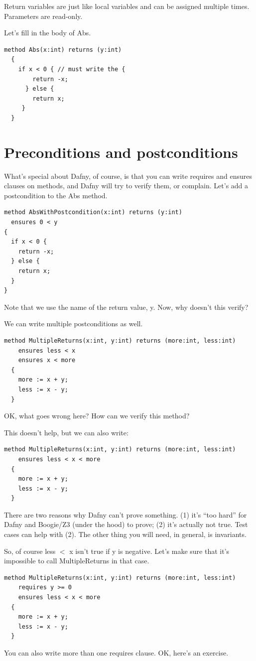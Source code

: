 \documentclass[11pt]{article}
\begin{document}
Return variables are just like local variables and can be assigned multiple times.
Parameters are read-only.

Let's fill in the body of Abs.
\begin{lstlisting}[language=dafny]
  method Abs(x:int) returns (y:int)
  {
    if x < 0 { // must write the {
        return -x;
      } else {
        return x;
     }
  }
\end{lstlisting}

\section*{Preconditions and postconditions}
What's special about Dafny, of course, is that you can write \textsf{requires}
and \textsf{ensures} clauses on methods, and Dafny will try to verify them, or
complain. Let's add a postcondition to the Abs method.
\begin{lstlisting}[language=dafny]
method AbsWithPostcondition(x:int) returns (y:int)
  ensures 0 < y
{
  if x < 0 {
    return -x;
  } else {
    return x;
  }
}
\end{lstlisting}
Note that we use the name of the return value, \textsf{y}. Now, why doesn't this verify?

We can write multiple postconditions as well.
\begin{lstlisting}[language=dafny]
  method MultipleReturns(x:int, y:int) returns (more:int, less:int)
    ensures less < x
    ensures x < more
  {
    more := x + y;
    less := x - y;
  }
\end{lstlisting}
OK, what goes wrong here? How can we verify this method?

This doesn't help, but we can also write:
\begin{lstlisting}[language=dafny]
  method MultipleReturns(x:int, y:int) returns (more:int, less:int)
    ensures less < x < more
  {
    more := x + y;
    less := x - y;
  }
\end{lstlisting}

There are two reasons why Dafny can't prove something.
(1) it's ``too hard'' for Dafny and Boogie/Z3 (under the hood) to prove; (2)
it's actually not true. Test cases can help with (2).
The other thing you will need, in general, is invariants.

So, of course \textsf{less $<$ x} isn't true if \textsf{y} is negative.
Let's make sure that it's impossible to call \textsf{MultipleReturns}
in that case.
\begin{lstlisting}[language=dafny]
  method MultipleReturns(x:int, y:int) returns (more:int, less:int)
    requires y >= 0
    ensures less < x < more
  {
    more := x + y;
    less := x - y;
  }
\end{lstlisting}
You can also write more than one requires clause. OK, here's an exercise.
\end{document}
